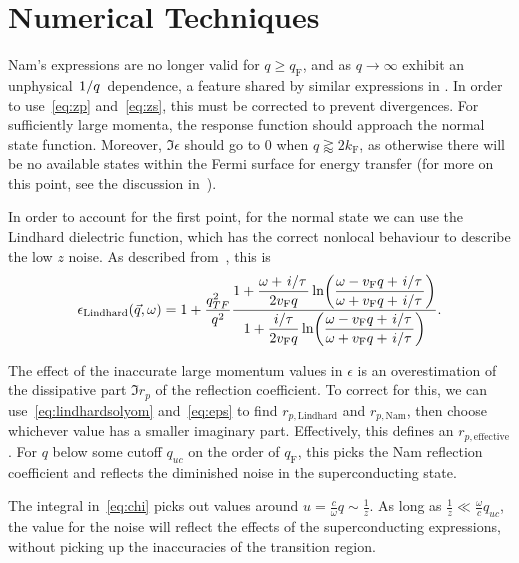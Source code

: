 \documentclass{article}
\newcommand{\vf}{v_{\mathrm{F}}}
\begin{document}
\section{Numerical Techniques \label{sec:technical}}

	Nam's expressions are no longer valid for $q \geq q_\mathrm{F}$, and as $q \rightarrow \infty$ exhibit an unphysical $\flatfrac{1}{q}$ dependence, a feature shared by similar expressions in \cite{AGD}.
	In order to use~\eqref{eq:zp} and~\eqref{eq:zs}, this must be corrected to prevent divergences.
	For sufficiently large momenta, the response function should approach the normal state function.
	Moreover, $\Im \epsilon$ should go to $0$ when $q \gtrapprox 2 k_{\mathrm{F}}$, as otherwise there will be no available states within the Fermi surface for energy transfer (for more on this point, see the discussion in~\cite{FetterWalecka}).

	In order to account for the first point, for the normal state we can use the Lindhard dielectric function, which has the correct nonlocal behaviour to describe the low $z$ noise\cite{QubitRelax}.
	As described from~\cite{SolyomV3}, this is
	\begin{equation}
		\epsilon_{\mathrm{Lindhard}}(\vec{q}, \omega) = 1 + \frac{q_{TF}^2}{q^2}\frac{\displaystyle 1 + \frac{\omega + \flatfrac{i}{\tau}}{2 \vf q} \ln(\frac{\omega - \vf q + \flatfrac{i}{\tau}}{\omega + \vf q + \flatfrac{i}{\tau}})}{\displaystyle 1 + \frac{\flatfrac{i}{\tau}}{2 \vf q} \ln(\frac{\omega - \vf q + \flatfrac{i}{\tau}}{\omega + \vf q + \flatfrac{i}{\tau}})}. \label{eq:lindhardsolyom}
	\end{equation}

	The effect of the inaccurate large momentum values in $\epsilon$ is an overestimation of the dissipative part $\Im r_p$ of the reflection coefficient.
	To correct for this, we can use~\eqref{eq:lindhardsolyom} and~\eqref{eq:eps} to find $r_{p\mathrm{, Lindhard}}$ and $r_{p\mathrm{, Nam}}$, then choose whichever value has a smaller imaginary part.
	Effectively, this defines an $r_{p\mathrm{, effective}}$.
	For $q$ below some cutoff $q_{uc}$ on the order of $q_{\mathrm{F}}$, this picks the Nam reflection coefficient and reflects the diminished noise in the superconducting state.

	The integral in~\eqref{eq:chi} picks out values around $u = \frac{c}{\omega} q \sim \frac{1}{z}$.
	As long as $\frac{1}{z} \ll \frac{\omega}{c} q_{uc}$, the value for the noise will reflect the effects of the superconducting expressions, without picking up the inaccuracies of the transition region.
\end{document}
